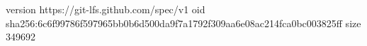 version https://git-lfs.github.com/spec/v1
oid sha256:6c6f99786f597965bb0b6d500da9f7a1792f309aa6e08ac214fca0bc003825ff
size 349692
